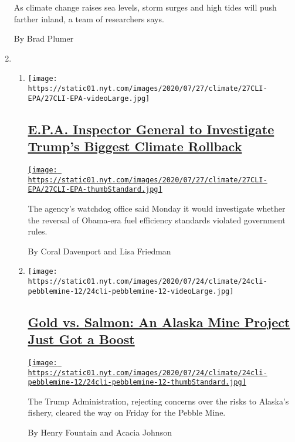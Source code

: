 \begin{enumerate}
  As climate change raises sea levels, storm surges and high tides will
  push farther inland, a team of researchers says.

  By Brad Plumer
\item
  \begin{enumerate}
  \def\labelenumii{\arabic{enumii}.}
  \item
    \texttt{[image: https://static01.nyt.com/images/2020/07/27/climate/27CLI-EPA/27CLI-EPA-videoLarge.jpg]}

    \hypertarget{epa-inspector-general-to-investigate-trumps-biggest-climate-rollback}{%
    \subsection{\texorpdfstring{\href{/2020/07/27/climate/trump-fuel-efficiency-rule.html}{E.P.A.
    Inspector General to Investigate Trump's Biggest Climate
    Rollback}}{E.P.A. Inspector General to Investigate Trump's Biggest Climate Rollback}}\label{epa-inspector-general-to-investigate-trumps-biggest-climate-rollback}}

    \href{/2020/07/27/climate/trump-fuel-efficiency-rule.html}{\texttt{[image: https://static01.nyt.com/images/2020/07/27/climate/27CLI-EPA/27CLI-EPA-thumbStandard.jpg]}}

    The agency's watchdog office said Monday it would investigate
    whether the reversal of Obama-era fuel efficiency standards violated
    government rules.

    By Coral Davenport and Lisa Friedman
  \item
    \texttt{[image: https://static01.nyt.com/images/2020/07/24/climate/24cli-pebblemine-12/24cli-pebblemine-12-videoLarge.jpg]}

    \hypertarget{gold-vs-salmon-an-alaska-mine-project-just-got-a-boost}{%
    \subsection{\texorpdfstring{\href{/2020/07/24/climate/pebble-mine-alaska-environment.html}{Gold
    vs. Salmon: An Alaska Mine Project Just Got a
    Boost}}{Gold vs. Salmon: An Alaska Mine Project Just Got a Boost}}\label{gold-vs-salmon-an-alaska-mine-project-just-got-a-boost}}

    \href{/2020/07/24/climate/pebble-mine-alaska-environment.html}{\texttt{[image: https://static01.nyt.com/images/2020/07/24/climate/24cli-pebblemine-12/24cli-pebblemine-12-thumbStandard.jpg]}}

    The Trump Administration, rejecting concerns over the risks to
    Alaska's fishery, cleared the way on Friday for the Pebble Mine.

    By Henry Fountain and Acacia Johnson
  \end{enumerate}
\end{enumerate}

